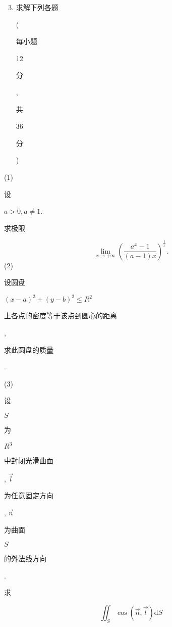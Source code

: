 \documentclass[10pt]{article}
\begin{document}
\begin{enumerate}
  \setcounter{enumi}{2}
  \item \begin{CJK}{UTF8}{mj}求解下列各题\end{CJK} (\begin{CJK}{UTF8}{mj}每小题\end{CJK} 12 \begin{CJK}{UTF8}{mj}分\end{CJK}, \begin{CJK}{UTF8}{mj}共\end{CJK} 36 \begin{CJK}{UTF8}{mj}分\end{CJK})
\end{enumerate}
(1) \begin{CJK}{UTF8}{mj}设\end{CJK} $a>0, a \neq 1$. \begin{CJK}{UTF8}{mj}求极限\end{CJK}
$$
\lim _{x \rightarrow+\infty}\left(\frac{a^{x}-1}{(a-1) x}\right)^{\frac{1}{x}} .
$$
(2) \begin{CJK}{UTF8}{mj}设圆盘\end{CJK} $(x-a)^{2}+(y-b)^{2} \leq R^{2}$ \begin{CJK}{UTF8}{mj}上各点的密度等于该点到圆心的距离\end{CJK}, \begin{CJK}{UTF8}{mj}求此圆盘的质量\end{CJK}.

(3) \begin{CJK}{UTF8}{mj}设\end{CJK} $S$ \begin{CJK}{UTF8}{mj}为\end{CJK} $R^{3}$ \begin{CJK}{UTF8}{mj}中封闭光滑曲面\end{CJK}, $\vec{l}$ \begin{CJK}{UTF8}{mj}为任意固定方向\end{CJK}, $\vec{n}$ \begin{CJK}{UTF8}{mj}为曲面\end{CJK} $S$ \begin{CJK}{UTF8}{mj}的外法线方向\end{CJK}. \begin{CJK}{UTF8}{mj}求\end{CJK}
$$
\iint_{S} \cos (\vec{n}, \vec{l}) \mathrm{d} S
$$
\end{document}
